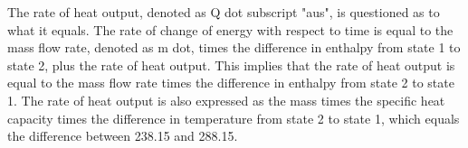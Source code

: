 The rate of heat output, denoted as Q dot subscript "aus", is questioned as to what it equals. The rate of change of energy with respect to time is equal to the mass flow rate, denoted as m dot, times the difference in enthalpy from state 1 to state 2, plus the rate of heat output. This implies that the rate of heat output is equal to the mass flow rate times the difference in enthalpy from state 2 to state 1. The rate of heat output is also expressed as the mass times the specific heat capacity times the difference in temperature from state 2 to state 1, which equals the difference between 238.15 and 288.15.